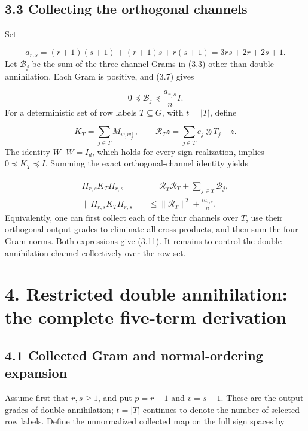 \documentclass[11pt,a4paper]{article}
\begin{document}
\subsection*{3.3 Collecting the orthogonal channels}
Set

\begin{equation}
a_{r,s}=(r+1)(s+1)+(r+1)s+r(s+1)
=3rs+2r+2s+1.
\tag{3.8}
\end{equation}
Let \(\mathcal B_j\) be the sum of the three channel Grams in (3.3) other than double annihilation. Each Gram is positive, and (3.7) gives

\begin{equation}
0\preceq\mathcal B_j\preceq\frac{a_{r,s}}n I.
\tag{3.9}
\end{equation}
For a deterministic set of row labels \(T\subseteq G\), with \(t=|T|\), define

\begin{equation}
K_T=\sum_{j\in T}M_{w_jw_j^\top},
\qquad
\mathcal R_Tz=\sum_{j\in T}e_j\otimes T_j^{--}z.
\tag{3.10}
\end{equation}
The identity \(W^\top W=I_d\), which holds for every sign realization, implies \(0\preceq K_T\preceq I\). Summing the exact orthogonal-channel identity yields

\begin{equation}
\begin{aligned}
\Pi_{r,s}K_T\Pi_{r,s}
&=\mathcal R_T^\dagger\mathcal R_T+\sum_{j\in T}\mathcal B_j,\\
\|\Pi_{r,s}K_T\Pi_{r,s}\|
&\le\|\mathcal R_T\|^2+\frac{t a_{r,s}}n.
\end{aligned}
\tag{3.11}
\end{equation}
Equivalently, one can first collect each of the four channels over \(T\), use their orthogonal output grades to eliminate all cross-products, and then sum the four Gram norms. Both expressions give (3.11). It remains to control the double-annihilation channel collectively over the row set.

\section*{4. Restricted double annihilation: the complete five-term derivation}
\subsection*{4.1 Collected Gram and normal-ordering expansion}
Assume first that \(r,s\ge1\), and put \(p=r-1\) and \(v=s-1\). These are the output grades of double annihilation; \(t=|T|\) continues to denote the number of selected row labels. Define the unnormalized collected map on the full sign spaces by
\end{document}
